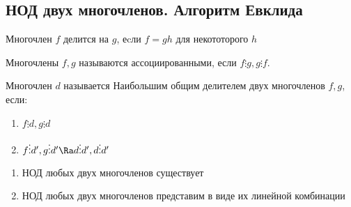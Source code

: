\subsection{НОД двух многочленов. Алгоритм Евклида}
\begin{definition}
    Многочлен \(f\) делится на \(g\), еcли \(f = gh\) для некототорого \(h\)
\end{definition}
\begin{definition}
    Многочлены \(f, g\) называются ассоциированными, если \(f \vdots g, g \vdots f\).
\end{definition}
\begin{definition}
    Многочлен  \(d\) называется Наибольшим общим делителем двух многочленов \(f, g\), если:
    \begin{enumerate}
        \item \(f \vdots d, g \vdots d\)
        \item \(f \vdots d', g \vdots d' \Ra d \vdots d', d \vdots d'\)
    \end{enumerate}
\end{definition}
\begin{theorem}\indent
    \begin{enumerate}
        \item НОД любых двух многочленов существует
        \item НОД любых двух многочленов представим в виде их линейной комбинации
    \end{enumerate}
\end{theorem}
